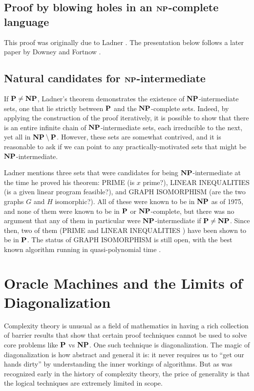 \subsection{Proof by blowing holes in an $\textbf{NP}$-complete language}
This proof was originally due to Ladner \cite{ladner1975structure}. The presentation below follows a later paper by Downey and Fortnow \cite{downey2003uniformly}.

\subsection{Natural candidates for $\textbf{NP}$-intermediate}
If $\textbf{P} \neq \textbf{NP}$, Ladner's theorem demonstrates the existence of $\textbf{NP}$-intermediate sets, one that lie strictly between $\textbf{P}$ and the $\textbf{NP}$-complete sets. Indeed, by applying the construction of the proof iteratively, it is possible to show that there is an entire infinite chain of $\textbf{NP}$-intermediate sets, each irreducible to the next, yet all in $\textbf{NP} \setminus \textbf{P}$. However, these sets are somewhat contrived, and it is reasonable to ask if we can point to any practically-motivated sets that might be $\textbf{NP}$-intermediate.

Ladner \cite{ladner1975structure} mentions three sets that were candidates for being $\textbf{NP}$-intermediate at the time he proved his theorem: PRIME (is $x$ prime?), LINEAR INEQUALITIES (is a given linear program feasible?), and GRAPH ISOMORPHISM (are the two graphs $G$ and $H$ isomorphic?). All of these were known to be in $\textbf{NP}$ as of 1975, and none of them were known to be in $\textbf{P}$ or $\textbf{NP}$-complete, but there was no argument that any of them in particular were $\textbf{NP}$-intermediate if $\textbf{P} \neq \textbf{NP}$. Since then, two of them (PRIME \cite{agrawal2004primes} and LINEAR INEQUALITIES \cite{khachiyan1980polynomial}) have been shown to be in $\textbf{P}$. The status of GRAPH ISOMORPHISM is still open, with the best known algorithm running in quasi-polynomial time \cite{babai2016graph}.

\section{Oracle Machines and the Limits of Diagonalization}
Complexity theory is unusual as a field of mathematics in having a rich collection of barrier results that show that certain proof techniques cannot be used to solve core problems like $\textbf{P}$ vs $\textbf{NP}$. One such technique is diagonalization. The magic of diagonalization is how abstract and general it is: it never requires us to ``get our hands dirty'' by understanding the inner workings of algorithms. But as was recognized early in the history of complexity theory, the price of generality is that the logical techniques are extremely limited in scope.

